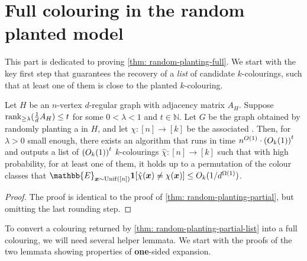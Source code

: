 \section{Full colouring in the random planted model} \label{app: plantedcolouring}

This part is dedicated to proving \cref{thm: random-planting-full}. We start with the key first step that guarantees the recovery of a \emph{list} of candidate $k$-colourings, such that at least one of them is close to the planted $k$-colouring.


\begin{theorem}
    \label{thm: random-planting-partial-list}
    Let $H$ be an $n$-vertex $d$-regular graph with adjacency matrix $A_H$.
    Suppose $\operatorname{rank}_{\geq \lambda}(\frac{1}{d}A_H) \leq t$ for some $0 < \lambda < 1$ and $t \in \mathbb{N}$.
    Let $G$ be the graph obtained by randomly planting a \kcl in $H$, and let $\chi: [n] \to [k]$ be the associated \kcl.
    Then, for $\lambda > 0$ small enough, there exists an algorithm that runs in time $n^{O(1)} \cdot \left(O_{k}(1)\right)^{t}$ and outputs a list of $\left(O_{k}(1)\right)^{t}$ $k$-colourings $\hat{\chi}: [n] \to [k]$ such that with high probability, for at least one of them, it holds up to a permutation of the colour classes that $\mathbb{E}_{\bm{x} \sim \operatorname{Unif}([n])} \1[\hat\chi(\bm{x}) \neq \chi(\bm{x})] \leq O_k(1/d^{\Omega(1)})$.
\end{theorem}
\begin{proof}
    The proof is identical to the proof of \cref{thm: random-planting-partial}, but omitting the last rounding step.
\end{proof}


To convert a colouring returned by \cref{thm: random-planting-partial-list} into a full colouring, we will need several helper lemmata. We start with the proofs of the two lemmata showing properties of \textbf{one}-sided expansion.

